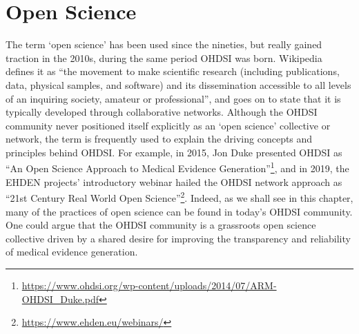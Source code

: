 \documentclass[11pt]{book}
\let\rmarkdownfootnote\footnote%
\def\footnote{\protect\rmarkdownfootnote}
\theoremstyle{definition}
\theoremstyle{definition}
\theoremstyle{definition}
\theoremstyle{remark}
\begin{document}
\hypertarget{open-science}{%
\section{Open Science}\label{open-science}}

The term `open science' has been used since the nineties, but really gained traction in the 2010s, during the same period OHDSI was born. Wikipedia \citep{wiki:Open_science} defines it as ``the movement to make scientific research (including publications, data, physical samples, and software) and its dissemination accessible to all levels of an inquiring society, amateur or professional'', and goes on to state that it is typically developed through collaborative networks. Although the OHDSI community never positioned itself explicitly as an `open science' collective or network, the term is frequently used to explain the driving concepts and principles behind OHDSI. For example, in 2015, Jon Duke presented OHDSI as ``An Open Science Approach to Medical Evidence Generation''\footnote{\url{https://www.ohdsi.org/wp-content/uploads/2014/07/ARM-OHDSI_Duke.pdf}}, and in 2019, the EHDEN projects' introductory webinar hailed the OHDSI network approach as ``21st Century Real World Open Science''\footnote{\url{https://www.ehden.eu/webinars/}}. Indeed, as we shall see in this chapter, many of the practices of open science can be found in today's OHDSI community. One could argue that the OHDSI community is a grassroots open science collective driven by a shared desire for improving the transparency and reliability of medical evidence generation.
\end{document}
